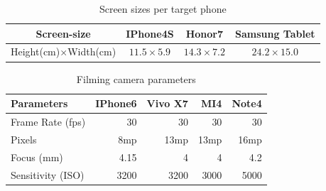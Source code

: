     \begin{table}[!t]
            \centering
            \caption{Screen sizes per target phone}
            \label{tab:screen-size}
            \scriptsize
            \begin{tabular}{cccc}
                \toprule
                \textbf{Screen-size}& \textbf{IPhone4S }& \textbf{Honor7} & \textbf{Samsung Tablet} \\
                \midrule
                Height(cm)$\times$Width(cm) & $11.5\times5.9$ & $14.3\times7.2$ & $24.2\times15.0$ \\
                \bottomrule
            \end{tabular}
    \end{table}

    \begin{table}[!t]
            \centering
            \caption{Filming camera parameters}
            \label{tab:camera-parameters}
            \small
            \begin{tabular}{lrrrr}
                \toprule
                \textbf{Parameters}& \textbf{IPhone6} & \textbf{Vivo X7} & \textbf{MI4} & \textbf{Note4} \\
                \midrule
                Frame Rate (fps) & $30$ & $30$& $30$ & 30 \\
                Pixels & 8mp & 13mp & 13mp & 16mp \\
                Focus (mm) & 4.15 & 4 & 4 & 4.2 \\
                Sensitivity (ISO) & 3200 & 3200 & 3000 & 5000 \\
                \bottomrule
            \end{tabular}
    \end{table}

